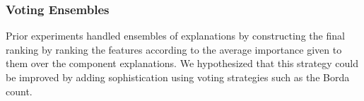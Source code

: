 \documentclass[mnsc,blindrev]{informs3}
\begin{document}
        
    
        
            
   
    
 
    




    
    

    
    
  
  
 
        \subsubsection{Voting Ensembles}
            Prior experiments handled ensembles of explanations by constructing the final ranking by ranking the features according to the average importance given to them over the component explanations. We hypothesized that this strategy could be improved by adding sophistication using voting strategies such as the Borda count. 
            
\end{document}
